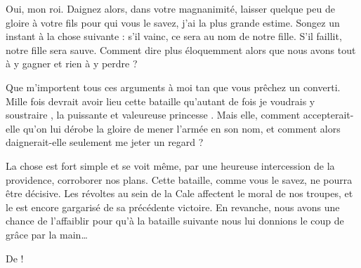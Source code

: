\begin{drama}
  \reinespeaks Oui, mon roi.
  Daignez alors, dans votre magnanimité, laisser quelque peu de gloire à votre fils \elena{} pour qui vous le savez, j’ai la plus grande estime. Songez un instant à la chose suivante : s’il vainc, ce sera au nom de notre fille. S’il faillit, notre fille sera sauve. Comment dire plus éloquemment alors que nous avons tout à y gagner et rien à y perdre ?

  \roispeaks Que m’importent tous ces arguments à moi tan que vous prêchez un converti. Mille fois devrait avoir lieu cette bataille qu’autant de fois je voudrais y soustraire \princesse, la puissante et valeureuse princesse \princesse. Mais elle, comment accepterait-elle qu’on lui dérobe la gloire de mener l’armée en son nom, et comment alors daignerait-elle seulement me jeter un regard ?

  \reinespeaks La chose est fort simple et se voit même, par une heureuse intercession de la providence, corroborer nos plans. Cette bataille, comme vous le savez, ne pourra être décisive. Les révoltes au sein de la Cale affectent le moral de nos troupes, et le \campoppose{} est encore gargarisé de sa précédente victoire. En revanche, nous avons une chance de l’affaiblir pour qu’à la bataille suivante nous lui donnions le coup de grâce par la main…

  \roispeaks De \princesse !
\end{drama}

\scene




\nopagebreak

